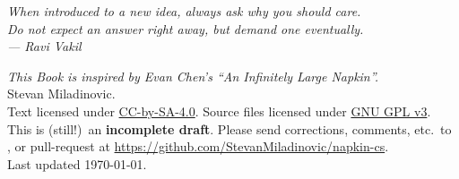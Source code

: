 \begin{titlepage}
	\vspace*{3cm}
	\begin{flushright}
		\large\itshape
		When introduced to a new idea, always ask why you should care. \\[0.2cm]
		Do not expect an answer right away, but demand one eventually. \\[0.8cm]
		--- Ravi Vakil~\cite{ref:vakil}
	\end{flushright}

	\vfill
	{
	\small
    \noindent \emph{This Book is inspired by Evan Chen's ``An Infinitely Large
      Napkin''\cite{ref:napkin}.} \\[0.4cm]
	\noindent {\copyright} \the\year{} Stevan Miladinovic. \\
	Text licensed under
	\href{https://creativecommons.org/licenses/by-sa/4.0/}{CC-by-SA-4.0}.
	Source files licensed under
	\href{https://choosealicense.com/licenses/gpl-3.0/}{GNU GPL v3}.
	\\[0.4cm]
	This is (still!)\ an \textbf{incomplete draft}.
	Please send corrections, comments,
	etc.\ to ,
	or pull-request at \url{https://github.com/StevanMiladinovic/napkin-cs}.
	\\[0.4cm]
	\noindent Last updated \today.
	\vspace*{1cm}
	}
\end{titlepage}
